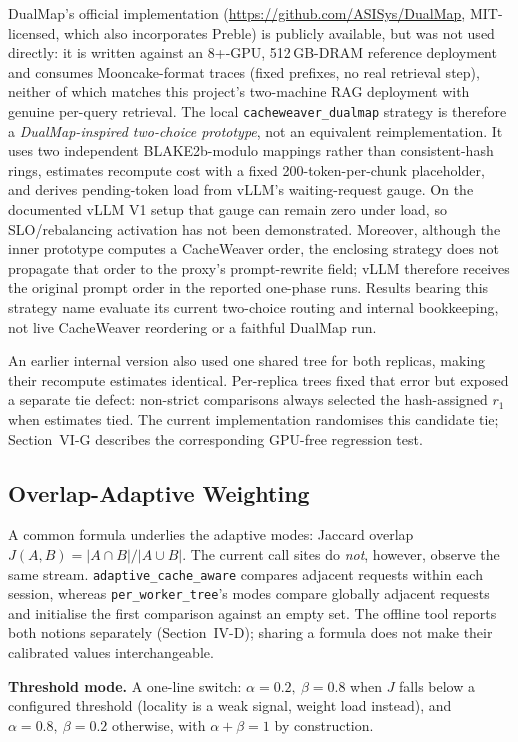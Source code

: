 \documentclass[conference]{IEEEtran}
\begin{document}
DualMap's official implementation (\url{https://github.com/ASISys/DualMap},
MIT-licensed, which also incorporates Preble) is publicly available,
but was not used directly: it is written against an 8+-GPU, 512\,GB-DRAM
reference deployment and consumes Mooncake-format traces (fixed
prefixes, no real retrieval step), neither of which matches this
project's two-machine RAG deployment with genuine per-query retrieval.
The local \texttt{cacheweaver\_dualmap} strategy is therefore a
\emph{DualMap-inspired two-choice prototype}, not an equivalent
reimplementation. It uses two independent BLAKE2b-modulo mappings
rather than consistent-hash rings, estimates recompute cost with a
fixed 200-token-per-chunk placeholder, and derives pending-token load
from vLLM's waiting-request gauge. On the documented vLLM V1 setup that
gauge can remain zero under load, so SLO/rebalancing activation has not
been demonstrated. Moreover, although the inner prototype computes a
CacheWeaver order, the enclosing strategy does not propagate that order
to the proxy's prompt-rewrite field; vLLM therefore receives the
original prompt order in the reported one-phase runs. Results bearing
this strategy name evaluate its current two-choice routing and internal
bookkeeping, not live CacheWeaver reordering or a faithful DualMap run.

An earlier internal version also used one shared tree for both
replicas, making their recompute estimates identical. Per-replica trees
fixed that error but exposed a separate tie defect: non-strict
comparisons always selected the hash-assigned $r_1$ when estimates tied.
The current implementation randomises this candidate tie; Section~VI-G
describes the corresponding GPU-free regression test.

\subsection{Overlap-Adaptive Weighting}

A common formula underlies the adaptive modes: Jaccard overlap
$J(A,B)=|A\cap B|/|A\cup B|$. The current call sites do \emph{not},
however, observe the same stream. \texttt{adaptive\_cache\_aware}
compares adjacent requests within each session, whereas
\texttt{per\_worker\_tree}'s modes compare globally adjacent requests
and initialise the first comparison against an empty set. The offline
tool reports both notions separately (Section~IV-D); sharing a formula
does not make their calibrated values interchangeable.

\textbf{Threshold mode.} A one-line switch: $\alpha{=}0.2,\ \beta{=}0.8$
when $J$ falls below a configured threshold (locality is a weak
signal, weight load instead), and $\alpha{=}0.8,\ \beta{=}0.2$
otherwise, with $\alpha+\beta{=}1$ by construction.
\end{document}
